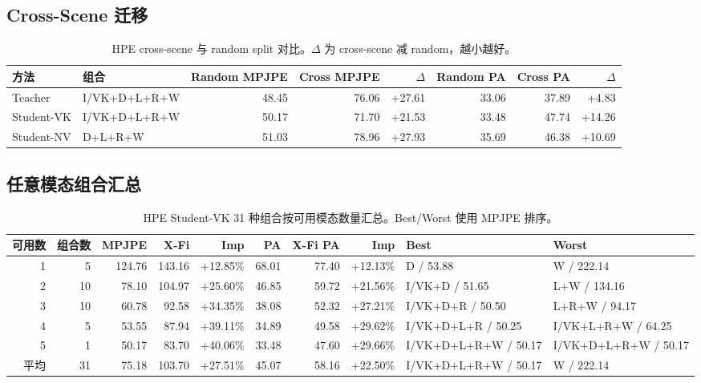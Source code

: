 \documentclass[UTF8,10pt]{ctexart}
\newcommand{\better}[1]{\textcolor{goodblue}{#1}}
\newcommand{\worse}[1]{\textcolor{badred}{#1}}
\begin{document}
\subsection{Cross-Scene 迁移}
\begin{table}[H]\centering\scriptsize
\caption{HPE cross-scene 与 random split 对比。$\Delta$ 为 cross-scene 减 random，越小越好。}
\begin{tabular}{llrrrrrr}
\toprule
方法 & 组合 & Random MPJPE & Cross MPJPE & $\Delta$ & Random PA & Cross PA & $\Delta$\\
\midrule
Teacher & I/VK+D+L+R+W & 48.45 & 76.06 & \worse{+27.61} & 33.06 & 37.89 & \worse{+4.83}\\
Student-VK & I/VK+D+L+R+W & 50.17 & 71.70 & \worse{+21.53} & 33.48 & 47.74 & \worse{+14.26}\\
Student-NV & D+L+R+W & 51.03 & 78.96 & \worse{+27.93} & 35.69 & 46.38 & \worse{+10.69}\\
\bottomrule
\end{tabular}
\end{table}

\subsection{任意模态组合汇总}
\begin{table}[H]\centering\tiny
\caption{HPE Student-VK 31 种组合按可用模态数量汇总。Best/Worst 使用 MPJPE 排序。}
\begin{tabular}{rrrrrrrrll}
\toprule
可用数 & 组合数 & MPJPE & X-Fi & Imp & PA & X-Fi PA & Imp & Best & Worst\\
\midrule
1 & 5 & 124.76 & 143.16 & \better{+12.85\%} & 68.01 & 77.40 & \better{+12.13\%} & D / 53.88 & W / 222.14\\
2 & 10 & 78.10 & 104.97 & \better{+25.60\%} & 46.85 & 59.72 & \better{+21.56\%} & I/VK+D / 51.65 & L+W / 134.16\\
3 & 10 & 60.78 & 92.58 & \better{+34.35\%} & 38.08 & 52.32 & \better{+27.21\%} & I/VK+D+R / 50.50 & L+R+W / 94.17\\
4 & 5 & 53.55 & 87.94 & \better{+39.11\%} & 34.89 & 49.58 & \better{+29.62\%} & I/VK+D+L+R / 50.25 & I/VK+L+R+W / 64.25\\
5 & 1 & 50.17 & 83.70 & \better{+40.06\%} & 33.48 & 47.60 & \better{+29.66\%} & I/VK+D+L+R+W / 50.17 & I/VK+D+L+R+W / 50.17\\
\midrule 平均 & 31 & 75.18 & 103.70 & \better{+27.51\%} & 45.07 & 58.16 & \better{+22.50\%} & I/VK+D+L+R+W / 50.17 & W / 222.14\\
\bottomrule
\end{tabular}
\end{table}
\end{document}
